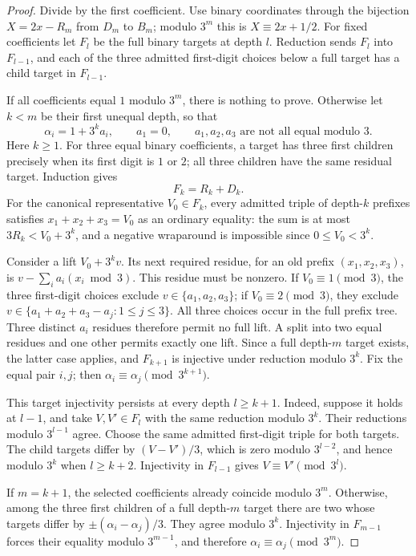 \begin{proof}
Divide by the first coefficient. Use binary coordinates through the
bijection $X=2x-R_m$ from $D_m$ to $B_m$; modulo $3^m$ this is
$X\equiv2x+1/2$. For fixed coefficients let $F_l$ be the full binary
targets at depth $l$. Reduction sends $F_l$ into $F_{l-1}$, and each
of the three admitted first-digit choices below a full target has a
child target in $F_{l-1}$.

If all coefficients equal $1$ modulo $3^m$, there is nothing to prove.
Otherwise let $k<m$ be their first unequal depth, so that
\[
 \alpha_i=1+3^k a_i,\qquad a_1=0,
 \qquad a_1,a_2,a_3\text{ are not all equal modulo }3.
\]
Here $k\geq1$. For three equal binary coefficients, a target has three
first children precisely when its first digit is $1$ or $2$; all three
children have the same residual target. Induction gives
\[
                         F_k=R_k+D_k.
\]
For the canonical representative $V_0\in F_k$, every admitted triple
of depth-$k$ prefixes satisfies $x_1+x_2+x_3=V_0$ as an ordinary
equality: the sum is at most $3R_k<V_0+3^k$, and a negative wraparound
is impossible since $0\leq V_0<3^k$.

Consider a lift $V_0+3^k v$. Its next required residue, for an old
prefix $(x_1,x_2,x_3)$, is
$v-\sum_i a_i(x_i\bmod3)$. This residue must be nonzero.
If $V_0\equiv1\pmod3$, the three first-digit choices exclude
$v\in\{a_1,a_2,a_3\}$; if $V_0\equiv2\pmod3$, they exclude
$v\in\{a_1+a_2+a_3-a_j:1\leq j\leq3\}$.
All three choices occur in the full prefix tree. Three distinct
$a_i$ residues therefore permit no full lift. A split into two equal
residues and one other permits exactly one lift. Since a full
depth-$m$ target exists, the latter case applies, and $F_{k+1}$ is
injective under reduction modulo $3^k$. Fix the equal pair $i,j$;
then $\alpha_i\equiv\alpha_j\pmod{3^{k+1}}$.

This target injectivity persists at every depth $l\geq k+1$.
Indeed, suppose it holds at $l-1$, and take $V,V'\in F_l$ with
the same reduction modulo $3^k$. Their reductions modulo
$3^{l-1}$ agree. Choose the same admitted first-digit triple for
both targets. The child targets differ by $(V-V')/3$, which is zero
modulo $3^{l-2}$, and hence modulo $3^k$ when $l\geq k+2$.
Injectivity in $F_{l-1}$ gives $V\equiv V'\pmod{3^l}$.

If $m=k+1$, the selected coefficients already coincide modulo $3^m$.
Otherwise, among the three first children of a full depth-$m$ target
there are two whose targets differ by
$\pm(\alpha_i-\alpha_j)/3$. They agree modulo $3^k$.
Injectivity in $F_{m-1}$ forces their equality modulo $3^{m-1}$,
and therefore $\alpha_i\equiv\alpha_j\pmod{3^m}$.
\end{proof}

